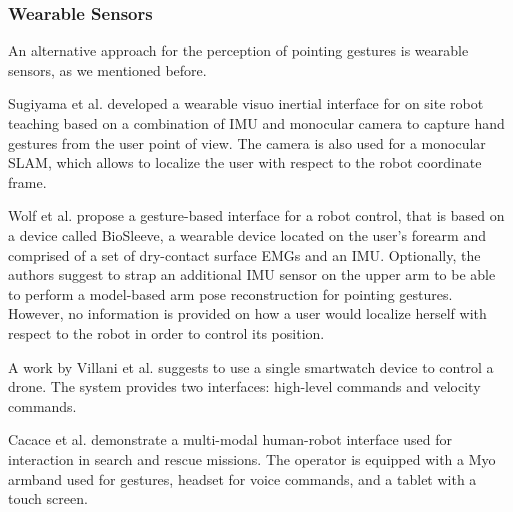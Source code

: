 \subsubsection*{Wearable Sensors}
An alternative approach for the perception of pointing gestures is wearable sensors, as we mentioned before. 

Sugiyama et al. \cite{Sugiyama2013} developed a wearable visuo inertial interface for on site robot teaching based on a combination of \ac{IMU} and monocular camera  to capture hand gestures from the user point of view. The camera is also used for a monocular \ac{SLAM}, which allows to localize the user with respect to the robot coordinate frame.

Wolf et al. \cite{Wolf2013} propose a gesture-based interface for a robot control, that is based on a device called BioSleeve, a wearable device located on the user's forearm and comprised of a set of dry-contact surface \ac{EMGs} and an \ac{IMU}. Optionally, the authors suggest to strap an additional \ac{IMU} sensor on the upper arm to be able to perform a model-based arm pose reconstruction for pointing gestures. However, no information is provided on how a user would localize herself with respect to the robot in order to control its position.

A work by Villani et al. \cite{Villani2017} suggests to use a single smartwatch device to control a drone. The system provides two interfaces: high-level commands and velocity commands.

Cacace et al. \cite{Cacace2016} demonstrate a multi-modal human-robot interface used for interaction in search and rescue missions. The operator is equipped with a Myo armband used for gestures, headset for voice commands, and a tablet with a touch screen.

